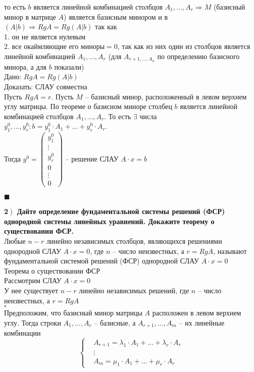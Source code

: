 \documentclass[a4paper,12pt]{article}
\begin{document}
то есть $b$ является линейной комбинацией столбцов $A_1, \ldots, A_r\Rightarrow M$ (базисный минор в матрице $A$) является базисным минором и в $(A|b)\Rightarrow RgA=Rg(A|b)$ так как\\ 1. он не является нулевым\\
2. все окаймляющие его миноры$=0$, так как из них один из столбцов является линейной комбинацией $A_1, \ldots, A_r$ (для $A_{r+1, \ldots, A_n}$ по определению базисного минора, а для $b$ показали)\\
Дано: $RgA=Rg(A|b)$\\
Доказать: СЛАУ совместна\\
Пусть $RgA=r$. Пусть $M$ -- базисный минор, расположенный в левом верхнем углу матрицы. По теореме о базисном миноре столбец $b$ является линейной комбинацией столбцов $A_1, \ldots, A_r$. То есть $\exists$ числа $y_1^0, \ldots, y_r^0: b=y_1^0\cdot A_1+\ldots+y_r^0\cdot A_r$.\\ Тогда $y^0=\begin{pmatrix}
y_1^0\\
\vdots\\
y_r^0\\
0\\
\vdots\\
0
\end{pmatrix}$ -- решение СЛАУ $A\cdot x=b$
\begin{flushright}
	$\blacksquare$
\end{flushright}
\textbf{2$\left.\right)$ Дайте определение фундаментальной системы решений (ФСР) однородной системы линейных уравнений. Докажите теорему о существовании ФСР.}\\Любые $n-r$ линейно независимых столбцов, являющихся решениями однородной СЛАУ $A\cdot x=0$, где $n$ -- число неизвестных, а $r=RgA$, называют фундаментальной системой решений (ФСР) однородной СЛАУ $A\cdot x=0$\\
Теорема о существовании ФСР\\
Рассмотрим СЛАУ $A\cdot x=0$\\
У нее существует $n-r$ линейно независимых решений, где $n$ -- число неизвестных, а $r=RgA$\\
$\square$\\
Предположим, что базисный минор матрицы $A$ расположен в левом верхнем углу. Тогда строки $A_1, \ldots, A_r$ -- базисные, а $A_{r+1}, \ldots, A_m$ -- их линейные комбинации\\
\[\left\{
\begin{aligned}
&A_{r+1}=\lambda_1\cdot A_1+\ldots+\lambda_r\cdot A_r\\
&\vdots\\
&A_m=\mu_1\cdot A_1+\ldots+\mu_r\cdot A_r
\end{aligned}\right.
\]
\end{document}
